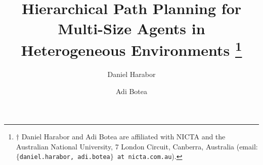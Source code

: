 \documentclass[conference]{IEEEtran}
\begin{document}
\long{}
\title{\ \\ \LARGE\bf Hierarchical Path Planning for Multi-Size Agents in Heterogeneous Environments \thanks{$\dagger$ Daniel Harabor and Adi Botea are affiliated with NICTA and the Australian National University, 7 London Circuit, Canberra, Australia (email: {\tt$\lbrace$daniel.harabor, adi.botea$\rbrace$ at nicta.com.au}).}}
\author{Daniel Harabor\symbolfootnote[2]{} \and Adi Botea\symbolfootnote[2]{}}

\maketitle









 









%
%
%
%
\end{document}

